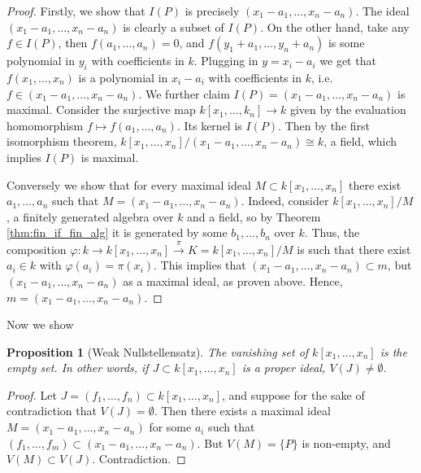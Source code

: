 \documentclass[12pt]{article}
\renewcommand{\phi}{\varphi}
\newtheorem{proposition}{Proposition}[section]
\begin{document}
    \begin{proof}
        Firstly, we show that $I(P)$ is precisely $(x_1 - a_1, \dots, x_n - a_n)$. The ideal $(x_1 - a_1, \dots, x_n - a_n)$ is clearly a subset of $I(P)$. On the other hand, take any $f \in I(P)$, then $f(a_1, \dots, a_n) = 0$, and $f(y_1 + a_1, \dots, y_n + a_n)$ is some polynomial in $y_i$ with coefficients in $k$. Plugging in $y = x_i - a_i$ we get that $f(x_1, \dots, x_n)$ is a polynomial in $x_i - a_i$ with coefficients in $k$, i.e. $f \in (x_1-a_1, \dots, x_n-a_n)$. We further claim $I(P) = (x_1 - a_1, \dots, x_n - a_n)$ is maximal. Consider the surjective map $k[x_1, \dots, k_n] \to k $ given by the evaluation homomorphism $f \mapsto f(a_1, \dots, a_n)$. Its kernel is $I(P)$. Then by the first isomorphism theorem, $k[x_1, \dots, x_n]/(x_1- a_1, \dots, x_n - a_n) \cong k$, a field, which implies $I(P)$ is maximal. \par 
        Conversely we show that for every maximal ideal $M \subset k[x_1, \dots, x_n]$ there exist $a_1, \dots, a_n$ such that $M = (x_1 - a_1, \dots, x_n - a_n)$. Indeed, consider $k[x_1, \dots, x_n]/M$, a finitely generated algebra over $k$ and a field, so by Theorem \ref{thm:fin_if_fin_alg} it is generated by some $b_1, \dots, b_n$ over $k$. Thus, the composition $\phi: k \to k[x_1, \dots, x_n] \xrightarrow{\pi} K = k[x_1, \dots, x_n]/M$ is such that there exist $a_i \in k$ with $\phi(a_i) = \pi(x_i)$. This implies that $(x_1 - a_1, \dots, x_n - a_n) \subset m$, but $(x_1 - a_1, \dots, x_n - a_n)$ as a maximal ideal, as proven above. Hence, $m = (x_1 - a_1, \dots, x_n - a_n)$. 
    \end{proof}

    Now we show 
    \begin{proposition}[Weak Nullstellensatz]
        The vanishing set of $k[x_1, \dots, x_n]$ is the empty set. In other words, if $J \subset k[x_1, \dots, x_n]$ is a proper ideal, $V(J) \neq \emptyset$. 
    \end{proposition}
    \begin{proof}
        Let $J = (f_1, \dots, f_n) \subset k[x_1, \dots, x_n]$, and suppose for the sake of contradiction that $V(J) = \emptyset$. Then there exists a maximal ideal $M = (x_1 - a_1, \dots, x_n - a_n)$ for some $a_i$ such that $(f_1, \dots, f_m) \subset (x_1-a_1, \dots, x_n - a_n)$. But $V(M) = \{P\}$ is non-empty, and $V(M) \subset V(J)$. Contradiction. 
    \end{proof} 
\end{document}
